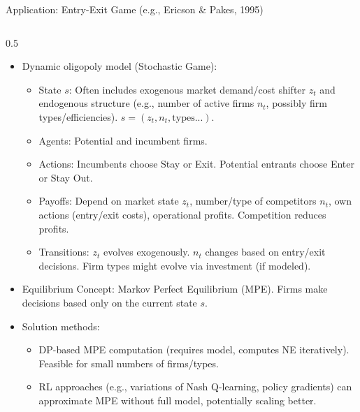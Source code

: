 \documentclass[10pt]{beamer}
\begin{document}

\begin{frame}{Application: Entry-Exit Game (e.g., Ericson & Pakes, 1995)}
    \begin{columns}[T] %
        \begin{column}{0.5\textwidth}
            \begin{itemize}
                \item Dynamic oligopoly model (Stochastic Game):
                \begin{itemize}
                    \item State $s$: Often includes exogenous market demand/cost shifter $z_t$ and endogenous structure (e.g., number of active firms $n_t$, possibly firm types/efficiencies). $s=(z_t, n_t, \text{types...})$.
                    \item Agents: Potential and incumbent firms.
                    \item Actions: Incumbents choose Stay or Exit. Potential entrants choose Enter or Stay Out.
                    \item Payoffs: Depend on market state $z_t$, number/type of competitors $n_t$, own actions (entry/exit costs), operational profits. Competition reduces profits.
                    \item Transitions: $z_t$ evolves exogenously. $n_t$ changes based on entry/exit decisions. Firm types might evolve via investment (if modeled).
                \end{itemize}

                \item Equilibrium Concept: Markov Perfect Equilibrium (MPE). Firms make decisions based only on the current state $s$.

                \item Solution methods:
                \begin{itemize}
                    \item DP-based MPE computation (requires model, computes NE iteratively). Feasible for small numbers of firms/types.
                    \item RL approaches (e.g., variations of Nash Q-learning, policy gradients) can approximate MPE without full model, potentially scaling better.
                \end{itemize}
            \end{itemize}
        \end{column}


\end{columns}
\end{frame}
\end{document}
